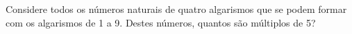 	\question[5] Considere todos os números naturais de quatro algarismos que se podem formar com os algarismos de 1 a 9.
		Destes números, quantos são múltiplos de 5?
		
		\begin{oneparchoices}
		\end{oneparchoices}